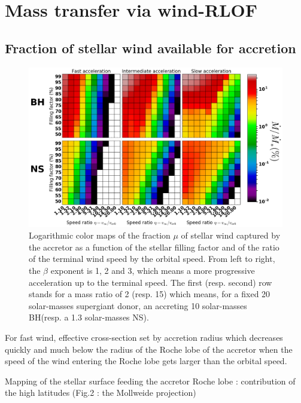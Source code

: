 \documentclass[letter]{aa}
\makeatletter
\newcommand*{\ns}{NS\@\xspace}
\newcommand*{\bh}{BH\@\xspace}
\makeatother
\begin{document}
\section{Mass transfer via wind-RLOF}
\label{sec:}

\subsection{Fraction of stellar wind available for accretion}
\label{sec:}

\begin{figure}[!b]
\centering
\includegraphics[width=2\columnwidth]{Pictures/mdot_grid.png}
\caption{Logarithmic color maps of the fraction $\mu$ of stellar wind captured by the accretor as a function of the stellar filling factor and of the ratio of the terminal wind speed by the orbital speed. From left to right, the $\beta$ exponent is 1, 2 and 3, which means a more progressive acceleration up to the terminal speed. The first (resp. second) row stands for a mass ratio of 2 (resp. 15) which means, for a fixed 20 solar-masses supergiant donor, an accreting 10 solar-masses \bh (resp. a 1.3 solar-masses \ns).}
\label{fig:mdot}
\end{figure} 

For fast wind, effective cross-section set by accretion radius which decreases quickly and much below the radius of the Roche lobe of the accretor when the speed of the wind entering the Roche lobe gets larger than the orbital speed.

Mapping of the stellar surface feeding the accretor Roche lobe : contribution of the high latitudes (Fig.2 : the Mollweide projection)
\end{document}
